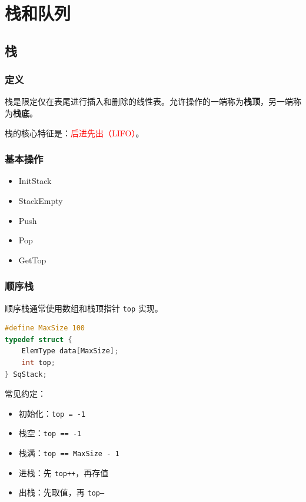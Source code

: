 \documentclass{../../note}
\begin{document}
\section{栈和队列}

\subsection{栈}

\subsubsection{定义}

栈是限定仅在表尾进行插入和删除的线性表。允许操作的一端称为\textbf{栈顶}，另一端称为\textbf{栈底}。

栈的核心特征是：\textcolor{red}{后进先出（LIFO）}。

\subsubsection{基本操作}

\begin{itemize}
  \item InitStack
  \item StackEmpty
  \item Push
  \item Pop
  \item GetTop
\end{itemize}

\subsubsection{顺序栈}

顺序栈通常使用数组和栈顶指针 \texttt{top} 实现。

\begin{lstlisting}[language=C]
#define MaxSize 100
typedef struct {
    ElemType data[MaxSize];
    int top;
} SqStack;
\end{lstlisting}

常见约定：

\begin{itemize}
  \item 初始化：\texttt{top = -1}
  \item 栈空：\texttt{top == -1}
  \item 栈满：\texttt{top == MaxSize - 1}
  \item 进栈：先 \texttt{top++}，再存值
  \item 出栈：先取值，再 \texttt{top--}
\end{itemize}
\end{document}
